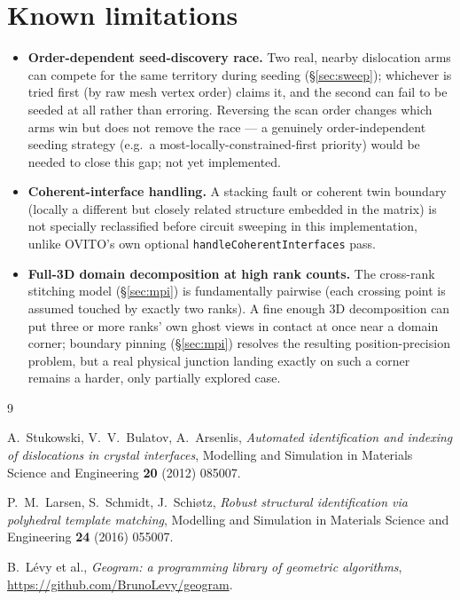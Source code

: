 \documentclass[11pt,a4paper]{article}
\newcommand{\code}[1]{\texttt{#1}}
\begin{document}
\section{Known limitations}

\begin{itemize}[nosep]
  \item \textbf{Order-dependent seed-discovery race.} Two real, nearby dislocation arms can compete
    for the same territory during seeding (\S\ref{sec:sweep}); whichever is tried first (by raw
    mesh vertex order) claims it, and the second can fail to be seeded at all rather than erroring.
    Reversing the scan order changes which arms win but does not remove the race — a genuinely
    order-independent seeding strategy (e.g.\ a most-locally-constrained-first priority) would be
    needed to close this gap; not yet implemented.
  \item \textbf{Coherent-interface handling.} A stacking fault or coherent twin boundary (locally a
    different but closely related structure embedded in the matrix) is not specially reclassified
    before circuit sweeping in this implementation, unlike OVITO's own optional
    \code{handleCoherentInterfaces} pass.
  \item \textbf{Full-3D domain decomposition at high rank counts.} The cross-rank stitching model
    (\S\ref{sec:mpi}) is fundamentally pairwise (each crossing point is assumed touched by exactly
    two ranks). A fine enough 3D decomposition can put three or more ranks' own ghost views in
    contact at once near a domain corner; boundary pinning (\S\ref{sec:mpi}) resolves the resulting
    position-precision problem, but a real physical junction landing exactly on such a corner
    remains a harder, only partially explored case.
\end{itemize}

\begin{thebibliography}{9}

A.~Stukowski, V.~V.~Bulatov, A.~Arsenlis,
\emph{Automated identification and indexing of dislocations in crystal interfaces},
Modelling and Simulation in Materials Science and Engineering \textbf{20} (2012) 085007.

P.~M.~Larsen, S.~Schmidt, J.~Schi\o{}tz,
\emph{Robust structural identification via polyhedral template matching},
Modelling and Simulation in Materials Science and Engineering \textbf{24} (2016) 055007.

B.~L\'evy et al., \emph{Geogram: a programming library of geometric algorithms},
\url{https://github.com/BrunoLevy/geogram}.

\end{thebibliography}
\end{document}
